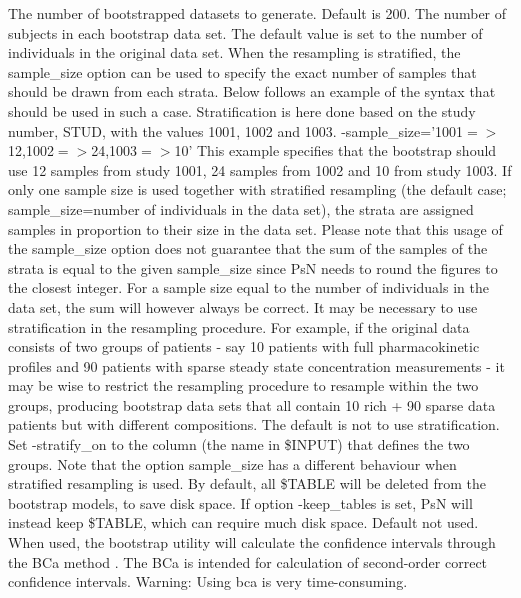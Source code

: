 \begin{optionlist}
The number of bootstrapped datasets to generate. Default is 200. 
\nextopt
{}
The number of subjects in each bootstrap data set. The default       value is set to the number of individuals in the original data set. When the resampling is stratified, the sample\_size option can be used to specify the exact number of samples that should be drawn from each strata. Below follows an example of the syntax that should be used in such a case. Stratification is here done based on the study number, STUD, with the values 1001, 1002 and 1003.  -sample\_size='1001$=>$12,1002$=>$24,1003$=>$10'                          This example specifies that the bootstrap should use 12 samples from study 1001, 24 samples from 1002 and 10 from study 1003. If only one sample size is used together with stratified resampling (the default case; sample\_size=number of individuals in the data set), the strata are assigned samples in proportion to their size in the data set. Please note that this usage of the sample\_size option does not guarantee that the sum of the samples of the strata is equal to the given sample\_size since PsN needs to round the figures to the closest integer. For a sample size equal to the number of individuals in the data set, the sum will however always be correct. 
\nextopt
{}
It may be necessary to use stratification in the resampling procedure. For example, if the original data consists of two groups of patients - say 10 patients with full pharmacokinetic profiles and 90 patients with sparse steady state concentration measurements - it may be wise to restrict the resampling procedure to resample within the two groups, producing bootstrap data sets that all contain 10 rich + 90 sparse data patients but with different compositions. The default is not to use stratification. Set -stratify\_on to the column (the name in \$INPUT) that defines the two groups. Note that the option sample\_size has a different behaviour when stratified resampling is used. 
\nextopt
{}
By default, all \$TABLE will be deleted from the bootstrap models, to save disk space. If option -keep\_tables is set, 
PsN will instead keep \$TABLE, which can require much disk space.
\nextopt
{}
Default not used. When used, the bootstrap utility will calculate the confidence intervals through the BCa method \cite{Efron}. The BCa is intended for calculation of second-order correct confidence intervals. Warning: Using bca is very time-consuming. 

\end{optionlist}
